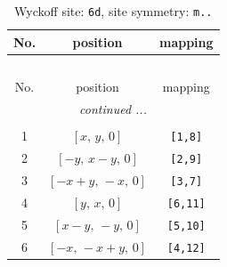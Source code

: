 \documentclass[fleqn,8pt]{jsarticle}
\begin{document}
\renewcommand{\arraystretch}{1.2}
\begin{longtable}{ccc}
\caption{Wyckoff site: {\tt 6d}, site symmetry: {\tt m..}}
 \\
 \hline \hline
No. & position & mapping \\ \hline \endfirsthead

\multicolumn{2}{l}{\tablename\ \thetable{}} \\
 \hline \hline
No. & position & mapping \\ \hline \endhead

 \hline \hline
\multicolumn{2}{r}{\footnotesize\it continued ...} \\ \endfoot

 \hline \hline
\multicolumn{2}{r}{} \\ \endlastfoot

1 & $\left[ x,\, y,\, 0 \right]$ & {\tt [1,8]} \\ \hline
2 & $\left[ - y,\, x - y,\, 0 \right]$ & {\tt [2,9]} \\ \hline
3 & $\left[ - x + y,\, - x,\, 0 \right]$ & {\tt [3,7]} \\ \hline
4 & $\left[ y,\, x,\, 0 \right]$ & {\tt [6,11]} \\ \hline
5 & $\left[ x - y,\, - y,\, 0 \right]$ & {\tt [5,10]} \\ \hline
6 & $\left[ - x,\, - x + y,\, 0 \right]$ & {\tt [4,12]} \\
\end{longtable}
\renewcommand{\arraystretch}{1.2}
\end{document}

